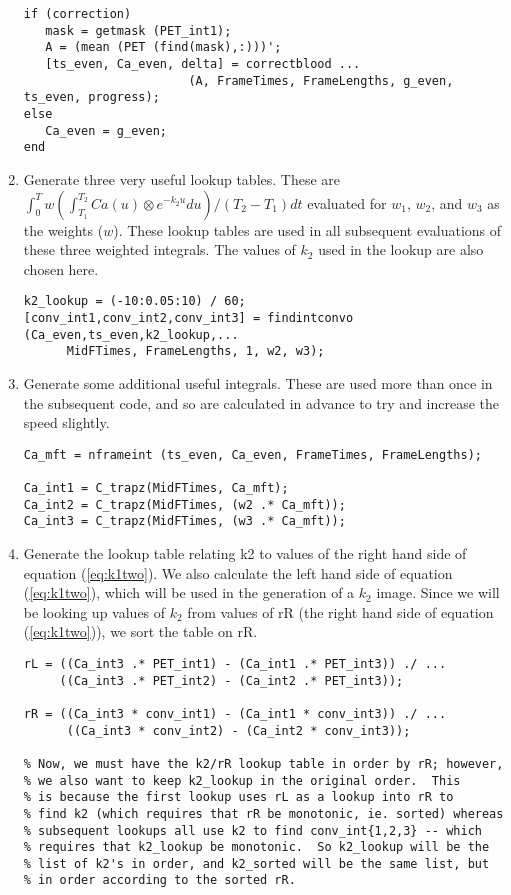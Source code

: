 \begin{enumerate}
\begin{verbatim}
if (correction)
   mask = getmask (PET_int1);
   A = (mean (PET (find(mask),:)))';
   [ts_even, Ca_even, delta] = correctblood ...
                       (A, FrameTimes, FrameLengths, g_even, ts_even, progress);
else
   Ca_even = g_even;
end
\end{verbatim}

\item Generate three very useful lookup tables.  These are
$\int_{0}^{T} w (\int_{T_1}^{T_2} Ca(u) \otimes e^{-k_{2}u} du)/(T_2
- T_1) dt$ evaluated for $w_1$, $w_2$, and $w_3$ as the weights
($w$).  These lookup tables are used in all subsequent evaluations of
these three weighted integrals.  The values of $k_2$ used in the
lookup are also chosen here.
\begin{verbatim}
k2_lookup = (-10:0.05:10) / 60;
[conv_int1,conv_int2,conv_int3] = findintconvo (Ca_even,ts_even,k2_lookup,...
      MidFTimes, FrameLengths, 1, w2, w3);
\end{verbatim}

\item Generate some additional useful integrals.  These are used more
than once in the subsequent code, and so are calculated in advance to
try and increase the speed slightly.
\begin{verbatim}
Ca_mft = nframeint (ts_even, Ca_even, FrameTimes, FrameLengths);      

Ca_int1 = C_trapz(MidFTimes, Ca_mft);
Ca_int2 = C_trapz(MidFTimes, (w2 .* Ca_mft));
Ca_int3 = C_trapz(MidFTimes, (w3 .* Ca_mft));
\end{verbatim}

\item Generate the lookup table relating k2 to values of the right
hand side of equation (\ref{eq:k1two}).  We also calculate the left
hand side of equation (\ref{eq:k1two}), which will be used in the
generation of a $k_2$ image.  Since we will be looking up values of
$k_2$ from values of rR (the right hand side of equation
(\ref{eq:k1two})), we sort the table on rR.
\begin{verbatim}
rL = ((Ca_int3 .* PET_int1) - (Ca_int1 .* PET_int3)) ./ ...
     ((Ca_int3 .* PET_int2) - (Ca_int2 .* PET_int3));

rR = ((Ca_int3 * conv_int1) - (Ca_int1 * conv_int3)) ./ ...
      ((Ca_int3 * conv_int2) - (Ca_int2 * conv_int3));

% Now, we must have the k2/rR lookup table in order by rR; however, 
% we also want to keep k2_lookup in the original order.  This
% is because the first lookup uses rL as a lookup into rR to
% find k2 (which requires that rR be monotonic, ie. sorted) whereas
% subsequent lookups all use k2 to find conv_int{1,2,3} -- which 
% requires that k2_lookup be monotonic.  So k2_lookup will be the
% list of k2's in order, and k2_sorted will be the same list, but 
% in order according to the sorted rR.


\end{verbatim}
\end{enumerate}

